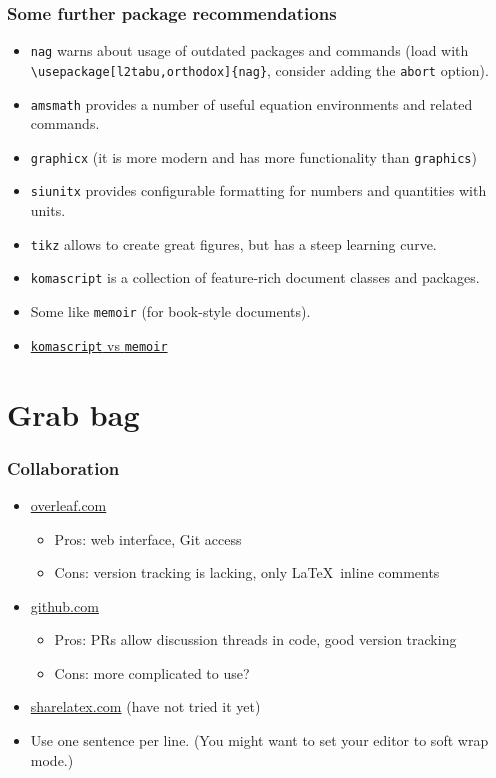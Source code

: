 \documentclass[aspectratio=1610,hyperref={colorlinks,linkcolor=}]{beamer}
\newcommand{\pkg}[1]{\texttt{#1}}
\begin{document}
\begin{frame}[fragile]
    \frametitle{Some further package recommendations}
    \begin{itemize}
        \item \pkg{nag} warns about usage of outdated packages and commands (load with \verb$\usepackage[l2tabu,orthodox]{nag}$, consider adding the \verb+abort+ option).
        \item \pkg{amsmath} provides a number of useful equation environments and related commands.
        \item \pkg{graphicx} (it is more modern and has more functionality than \verb+graphics+)
        \item \pkg{siunitx} provides configurable formatting for numbers and quantities with units.
        \item \pkg{tikz} allows to create great figures, but has a steep learning curve.
        \item \pkg{komascript} is a collection of feature-rich document classes and packages.
        \item Some like \pkg{memoir} (for book-style documents).
        \item \href{http://tex.stackexchange.com/questions/7742/what-are-the-strengths-and-weaknesses-of-koma-script-and-memoir}{\pkg{komascript} vs \pkg{memoir}}
    \end{itemize}
\end{frame}

\section{Grab bag}
\begin{frame}
    \frametitle{Collaboration}
    \begin{itemize}
        \item \url{overleaf.com}
            \begin{itemize}
                \item Pros: web interface, Git access
                \item Cons: version tracking is lacking, only \LaTeX\ inline comments
            \end{itemize}
        \item \url{github.com}
            \begin{itemize}
                \item Pros: PRs allow discussion threads in code, good version tracking
                \item Cons: more complicated to use?
            \end{itemize}
        \item \url{sharelatex.com} (have not tried it yet)
        \item Use one sentence per line. (You might want to set your editor to soft wrap mode.)
    \end{itemize}
\end{frame}
\end{document}
